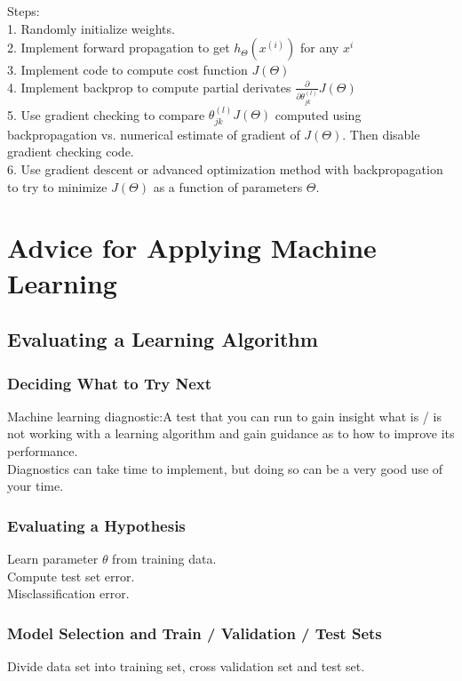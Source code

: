 \documentclass{article}
\begin{document}
Steps:\\
1. Randomly initialize weights.\\
2. Implement forward propagation to get $h_\Theta(x^{(i)})$ for any $x^i$\\
3. Implement code to compute cost function $J(\Theta)$ \\
4. Implement backprop to compute partial derivates $\frac{\partial}{\partial \theta_{jk}^{(l)}} J(\Theta)$ \\
5. Use gradient checking to compare $\theta_{jk}^{(l)} J(\Theta)$ computed using backpropagation vs. numerical estimate of gradient of $J(\Theta)$. Then disable gradient checking code.\\
6. Use gradient descent or advanced optimization method with backpropagation to try to minimize $J(\Theta)$ as a function of parameters $\Theta$.

\newpage

\section{Advice for Applying Machine Learning}
\subsection{Evaluating a Learning Algorithm}
\subsubsection{Deciding What to Try Next}
Machine learning diagnostic:A test that you can run to gain insight what is / is not working with a learning algorithm and gain guidance as to how to improve its performance.\\

Diagnostics can take time to implement, but doing so can be a very good use of your time.
\subsubsection{Evaluating a Hypothesis}
Learn parameter $\theta$ from training data. \\
Compute test set error. \\
Misclassification error.
\subsubsection{Model Selection and Train / Validation / Test Sets}
Divide data set into training set, cross validation set and test set.
\end{document}
